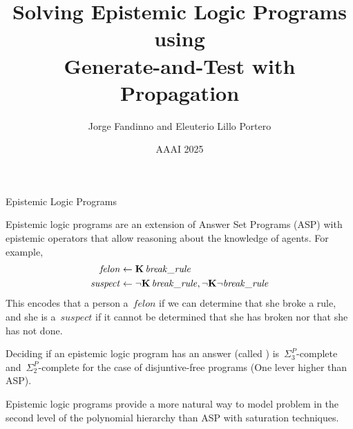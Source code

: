 \documentclass[aspectratio=169,svgnames,xcolor=table,t]{beamer}
\author[J. Fandinno \& Eleuterio Lillo Portero]{{\usebeamercolor[fg]{alerted text}Jorge Fandinno} and Eleuterio Lillo Portero}
\date{AAAI 2025}
\institute[UNO]{
    Department of Computer Science \\
    University of Nebraska Omaha
}
\title{Solving Epistemic Logic Programs using\\Generate-and-Test with Propagation}
\begin{document}
\frame{\titlepage}
\begin{frame}{Epistemic Logic Programs}
    \begin{myitemize}
        \item Epistemic logic programs are an extension of Answer Set Programs (ASP) with epistemic operators that allow reasoning about the knowledge of agents. For example,
        \begin{align*}
            \mathit{felon}   &\leftarrow \mathbf{K}\, \mathit{break\_rule}
            \\
            \mathit{suspect} &\leftarrow \neg \mathbf{K}\, \mathit{break\_rule}, \neg \mathbf{K} \neg \mathit{break\_rule}
        \end{align*}
        This encodes that a person a~$\mathit{felon}$ if we can determine that she broke a rule, and she is a~$\mathit{suspect}$ if it cannot be determined that she has broken nor that she has not done.
    
        \bigskip

        \item Deciding if an epistemic logic program has an answer (called ) is~$\Sigma^P_3$-complete and~$\Sigma^P_2$-complete for the case of disjuntive\nobreak-free programs (One lever higher than ASP).
        
        \bigskip

        \item Epistemic logic programs provide a more natural way to model problem in the second level of the polynomial hierarchy than ASP with saturation techniques.
    \end{myitemize}
    \end{frame}
\end{document}
